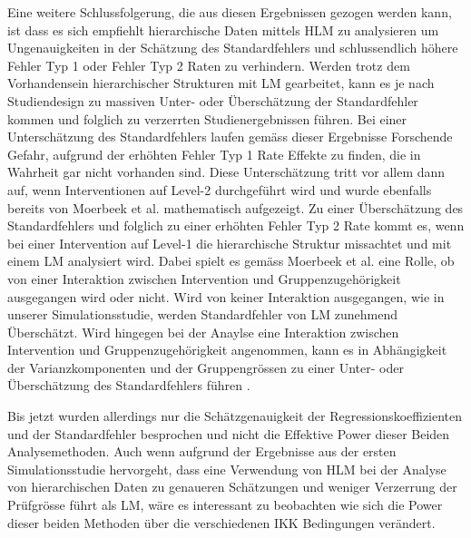 \documentclass[12pt]{article}\usepackage[]{graphicx}\usepackage[]{color}
\begin{document}
Eine weitere Schlussfolgerung, die aus diesen Ergebnissen gezogen werden kann, ist dass es sich empfiehlt hierarchische Daten mittels HLM zu analysieren um Ungenauigkeiten in der Schätzung des Standardfehlers und schlussendlich höhere Fehler Typ 1 oder Fehler Typ 2 Raten zu verhindern. Werden trotz dem Vorhandensein hierarchischer Strukturen mit LM gearbeitet, kann es je nach Studiendesign zu massiven Unter- oder Überschätzung der Standardfehler kommen und folglich zu verzerrten Studienergebnissen führen. Bei einer Unterschätzung des Standardfehlers laufen gemäss dieser Ergebnisse Forschende Gefahr, aufgrund der erhöhten Fehler Typ 1 Rate Effekte zu finden, die in Wahrheit gar nicht vorhanden sind. Diese Unterschätzung tritt vor allem dann auf, wenn Interventionen auf Level-2 durchgeführt wird und wurde ebenfalls bereits von Moerbeek et al. \citeyearpar{MOERBEEK2003341} mathematisch aufgezeigt. Zu einer Überschätzung des Standardfehlers und folglich zu einer erhöhten Fehler Typ 2 Rate kommt es, wenn bei einer Intervention auf Level-1 die hierarchische Struktur missachtet und mit einem LM analysiert wird. Dabei spielt es gemäss Moerbeek et al. \citeyearpar{MOERBEEK2003341} eine Rolle, ob von einer Interaktion zwischen Intervention und Gruppenzugehörigkeit ausgegangen wird oder nicht. Wird von keiner Interaktion ausgegangen, wie in unserer Simulationsstudie, werden Standardfehler von LM zunehmend Überschätzt. Wird hingegen bei der Anaylse eine Interaktion zwischen Intervention und Gruppenzugehörigkeit angenommen, kann es in Abhängigkeit der Varianzkomponenten und der Gruppengrössen zu einer Unter- oder Überschätzung des Standardfehlers führen \citep{MOERBEEK2003341}. 

Bis jetzt wurden allerdings nur die Schätzgenauigkeit der Regressionskoeffizienten und der Standardfehler besprochen und nicht die Effektive Power dieser Beiden Analysemethoden. Auch wenn aufgrund der Ergebnisse aus der ersten Simulationsstudie hervorgeht, dass eine Verwendung von HLM bei der Analyse von hierarchischen Daten zu genaueren Schätzungen und weniger Verzerrung der Prüfgrösse führt als LM, wäre es interessant zu beobachten wie sich die Power dieser beiden Methoden über die verschiedenen IKK Bedingungen verändert. 
\end{document}
